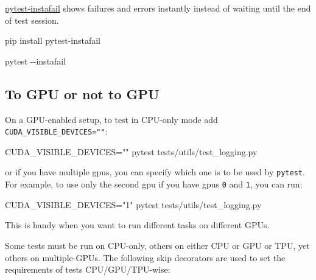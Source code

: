 \documentclass[
]{report}
\newenvironment{Shaded}{\begin{snugshade}}{\end{snugshade}}
\newcommand{\AttributeTok}[1]{\textcolor[rgb]{0.40,0.45,0.13}{#1}}
\newcommand{\ExtensionTok}[1]{\textcolor[rgb]{0.00,0.23,0.31}{#1}}
\newcommand{\NormalTok}[1]{\textcolor[rgb]{0.00,0.23,0.31}{#1}}
\newcommand{\OperatorTok}[1]{\textcolor[rgb]{0.37,0.37,0.37}{#1}}
\newcommand{\StringTok}[1]{\textcolor[rgb]{0.13,0.47,0.30}{#1}}
\newcommand{\VariableTok}[1]{\textcolor[rgb]{0.07,0.07,0.07}{#1}}
\begin{document}
\href{https://github.com/pytest-dev/pytest-instafail}{pytest-instafail}
shows failures and errors instantly instead of waiting until the end of
test session.

\begin{Shaded}
\begin{Highlighting}[]
\ExtensionTok{pip}\NormalTok{ install pytest{-}instafail}
\end{Highlighting}
\end{Shaded}

\begin{Shaded}
\begin{Highlighting}[]
\ExtensionTok{pytest} \AttributeTok{{-}{-}instafail}
\end{Highlighting}
\end{Shaded}

\subsection{To GPU or not to GPU}\label{to-gpu-or-not-to-gpu}

On a GPU-enabled setup, to test in CPU-only mode add
\texttt{CUDA\_VISIBLE\_DEVICES=""}:

\begin{Shaded}
\begin{Highlighting}[]
\VariableTok{CUDA\_VISIBLE\_DEVICES}\OperatorTok{=}\StringTok{""} \ExtensionTok{pytest}\NormalTok{ tests/utils/test\_logging.py}
\end{Highlighting}
\end{Shaded}

or if you have multiple gpus, you can specify which one is to be used by
\texttt{pytest}. For example, to use only the second gpu if you have
gpus \texttt{0} and \texttt{1}, you can run:

\begin{Shaded}
\begin{Highlighting}[]
\VariableTok{CUDA\_VISIBLE\_DEVICES}\OperatorTok{=}\StringTok{"1"} \ExtensionTok{pytest}\NormalTok{ tests/utils/test\_logging.py}
\end{Highlighting}
\end{Shaded}

This is handy when you want to run different tasks on different GPUs.

Some tests must be run on CPU-only, others on either CPU or GPU or TPU,
yet others on multiple-GPUs. The following skip decorators are used to
set the requirements of tests CPU/GPU/TPU-wise:
\end{document}
